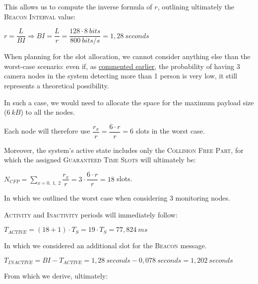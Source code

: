 \documentclass[a4paper,11pt]{article} %
\begin{document}
\medskip

This allows us to compute the inverse formula of $r$, outlining ultimately the \textsc{Beacon Interval} value:

\smallskip

$r = \dfrac{L}{BI} \Rightarrow BI = \dfrac{L}{r} = \dfrac{128 \cdot 8\ bits}{800\ bits/s} = 1,28\ seconds$

\bigskip

\label{worst-case}

When planning for the slot allocation, we cannot consider anything else than the worst-case scenario: even if, as \hyperref[rate-probability]{commented earlier}, the probability of having 3 camera nodes in the system detecting more than 1 person is very low, it still represents a theoretical possibility.

\smallskip

In such a case, we would need to allocate the space for the maximum payload size ($6\ kB$) to all the nodes.

\smallskip

Each node will therefore use $\dfrac{r_x}{r} = \dfrac{6 \cdot r}{r} = 6$ slots in the worst case.

\medskip

Moreover, the system's active state includes only the \textsc{Collision Free Part}, for which the assigned \textsc{Guaranteed Time Slots} will ultimately be:

\medskip

$N_{CFP} = \displaystyle\sum_{x = 0,\ 1,\ 2} \dfrac{r_x}{r} = 3 \cdot \dfrac{6 \cdot r}{r} = 18$ slots.

\medskip

In which we outlined the worst case when considering 3 monitoring nodes.

\bigskip

\textsc{Activity} and \textsc{Inactivity} periods will immediately follow:

\smallskip

$T_{ACTIVE} = (18 + 1) \cdot T_S = 19 \cdot T_S = 77,824\ ms$

\smallskip

In which we considered an additional slot for the \textsc{Beacon} message.

\medskip

$T_{INACTIVE} = BI - T_{ACTIVE} = 1,28\ seconds - 0,078\ seconds = 1,202\ seconds$

\medskip

From which we derive, ultimately:
\end{document}

